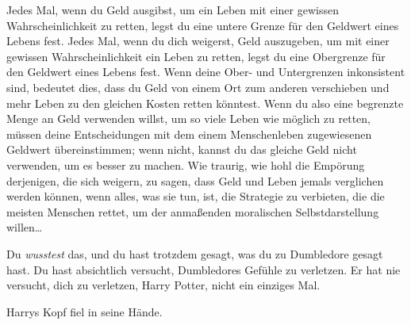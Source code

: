 \begin{em}
Jedes Mal, wenn du Geld ausgibst, um ein Leben mit einer gewissen Wahrscheinlichkeit zu retten, legst du eine untere Grenze für den Geldwert eines Lebens fest. Jedes Mal, wenn du dich weigerst, Geld auszugeben, um mit einer gewissen Wahrscheinlichkeit ein Leben zu retten, legst du eine Obergrenze für den Geldwert eines Lebens fest. Wenn deine Ober- und Untergrenzen inkonsistent sind, bedeutet dies, dass du Geld von einem Ort zum anderen verschieben und mehr Leben zu den gleichen Kosten retten könntest. Wenn du also eine begrenzte Menge an Geld verwenden willst, um so viele Leben wie möglich zu retten, müssen deine Entscheidungen mit dem einem Menschenleben zugewiesenen Geldwert übereinstimmen; wenn nicht, kannst du das gleiche Geld nicht verwenden, um es besser zu machen. Wie traurig, wie hohl die Empörung derjenigen, die sich weigern, zu sagen, dass Geld und Leben jemals verglichen werden können, wenn alles, was sie tun, ist, die Strategie zu verbieten, die die meisten Menschen rettet, um der anmaßenden moralischen Selbstdarstellung willen…



Du \emph{wusstest} das, und du hast trotzdem gesagt, was du zu Dumbledore gesagt hast. Du hast absichtlich versucht, Dumbledores Gefühle zu verletzen. Er hat nie versucht, dich zu verletzen, Harry Potter, nicht ein einziges Mal.
\end{em}
Harrys Kopf fiel in seine Hände.

